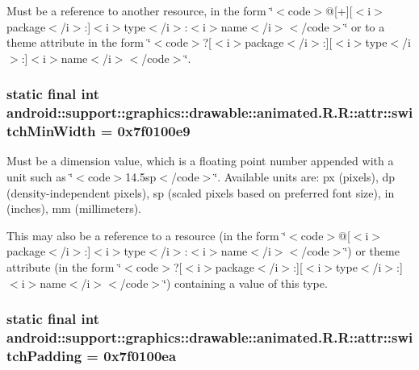 Must be a reference to another resource, in the form \char`\"{}$<$code$>$@\mbox{[}+\mbox{]}\mbox{[}$<$i$>$package$<$/i$>$:\mbox{]}$<$i$>$type$<$/i$>$:$<$i$>$name$<$/i$>$$<$/code$>$\char`\"{} or to a theme attribute in the form \char`\"{}$<$code$>$?\mbox{[}$<$i$>$package$<$/i$>$:\mbox{]}\mbox{[}$<$i$>$type$<$/i$>$:\mbox{]}$<$i$>$name$<$/i$>$$<$/code$>$\char`\"{}. \hypertarget{classandroid_1_1support_1_1graphics_1_1drawable_1_1animated_1_1_r_1_1attr_b4e1d31ed0ea4e6cbaf833df6f063c0b}{
\subsubsection[{switchMinWidth}]{\setlength{\rightskip}{0pt plus 5cm}static final int android::support::graphics::drawable::animated.R.R::attr::switchMinWidth = 0x7f0100e9}}
\label{classandroid_1_1support_1_1graphics_1_1drawable_1_1animated_1_1_r_1_1attr_b4e1d31ed0ea4e6cbaf833df6f063c0b}


Must be a dimension value, which is a floating point number appended with a unit such as \char`\"{}$<$code$>$14.5sp$<$/code$>$\char`\"{}. Available units are: px (pixels), dp (density-independent pixels), sp (scaled pixels based on preferred font size), in (inches), mm (millimeters). 

This may also be a reference to a resource (in the form \char`\"{}$<$code$>$@\mbox{[}$<$i$>$package$<$/i$>$:\mbox{]}$<$i$>$type$<$/i$>$:$<$i$>$name$<$/i$>$$<$/code$>$\char`\"{}) or theme attribute (in the form \char`\"{}$<$code$>$?\mbox{[}$<$i$>$package$<$/i$>$:\mbox{]}\mbox{[}$<$i$>$type$<$/i$>$:\mbox{]}$<$i$>$name$<$/i$>$$<$/code$>$\char`\"{}) containing a value of this type. \hypertarget{classandroid_1_1support_1_1graphics_1_1drawable_1_1animated_1_1_r_1_1attr_da78a455e03d0f355658709f686cd489}{
\subsubsection[{switchPadding}]{\setlength{\rightskip}{0pt plus 5cm}static final int android::support::graphics::drawable::animated.R.R::attr::switchPadding = 0x7f0100ea}}
\label{classandroid_1_1support_1_1graphics_1_1drawable_1_1animated_1_1_r_1_1attr_da78a455e03d0f355658709f686cd489}


